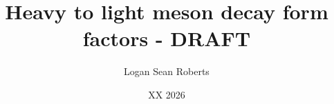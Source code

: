 \documentclass[12pt,crest,nopardent,msfonts,fancychap,hyper,nomencl]{glaphdths}
\author{Logan Sean Roberts}
\title{Heavy to light meson decay form factors - DRAFT}%
\date{\MakeUppercase{XX 2026}}
\begin{document}
\let\cleardoublepage\clearpage



\cleardoublepage%

\startbody

%
%
%
%
%


%



\end{document}
